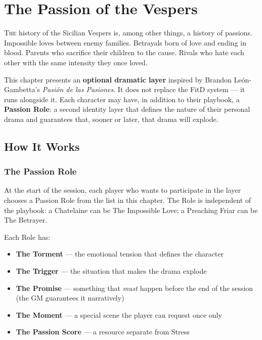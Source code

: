 
\chapter{The Passion of the Vespers}

\lettrine[lines=3]{T}{he} history of the Sicilian Vespers is, among other
things, a history of passions. Impossible loves between enemy families.
Betrayals born of love and ending in blood. Parents who sacrifice their
children to the cause. Rivals who hate each other with the same intensity
they once loved.

This chapter presents an \textbf{optional dramatic layer} inspired by
Brandon León-Gambetta's \textit{Pasión de las Pasiones}. It does not
replace the FitD system — it runs alongside it. Each character may have,
in addition to their playbook, a \textbf{Passion Role}: a second identity
layer that defines the nature of their personal drama and guarantees that,
sooner or later, that drama will explode.


\secsep

\section{How It Works}

\subsection{The Passion Role}

At the start of the session, each player who wants to participate in
the layer chooses a Passion Role from the list in this chapter. The Role
is independent of the playbook: a Chatelaine can be The Impossible Love;
a Preaching Friar can be The Betrayer.

Each Role has:
\begin{itemize}[nosep]
  \item \textbf{The Torment} --- the emotional tension that defines the character
  \item \textbf{The Trigger} --- the situation that makes the drama explode
  \item \textbf{The Promise} --- something that \textit{must} happen before
    the end of the session (the GM guarantees it narratively)
  \item \textbf{The Moment} --- a special scene the player can request once only
  \item \textbf{The Passion Score} --- a resource separate from Stress
\end{itemize}

